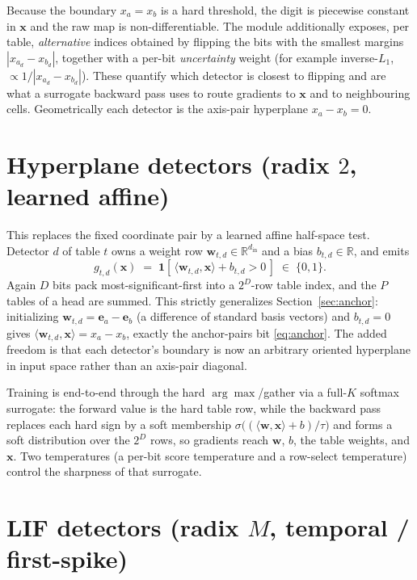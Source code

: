 \documentclass[11pt]{article}
\newcommand{\R}{\mathbb{R}}
\newcommand{\x}{\mathbf{x}}
\newcommand{\w}{\mathbf{w}}
\newcommand{\ind}[1]{\mathbf{1}\!\left[#1\right]}
\begin{document}
Because the boundary $x_a = x_b$ is a hard threshold, the digit is piecewise constant in $\x$ and the raw map
is non-differentiable. The module additionally exposes, per table, \emph{alternative} indices obtained by
flipping the bits with the smallest margins $|x_{a_d} - x_{b_d}|$, together with a per-bit \emph{uncertainty}
weight (for example inverse-$L_1$, $\propto 1/|x_{a_d} - x_{b_d}|$). These quantify which detector is closest
to flipping and are what a surrogate backward pass uses to route gradients to $\x$ and to neighbouring cells.
Geometrically each detector is the axis-pair hyperplane $x_a - x_b = 0$.

\section{Hyperplane detectors (radix $2$, learned affine)}
\label{sec:hyperplane}

This replaces the fixed coordinate pair by a learned affine half-space test. Detector $d$ of table $t$ owns a
weight row $\w_{t,d} \in \R^{d_{\mathrm{in}}}$ and a bias $b_{t,d} \in \R$, and emits
\begin{equation}
  g_{t,d}(\x) \;=\; \ind{\, \langle \w_{t,d}, \x \rangle + b_{t,d} > 0 \,} \;\in\; \{0,1\}.
  \label{eq:hyperplane}
\end{equation}
Again $D$ bits pack most-significant-first into a $2^{D}$-row table index, and the $P$ tables of a head are
summed. This strictly generalizes Section~\ref{sec:anchor}: initializing $\w_{t,d} = \mathbf{e}_{a} -
\mathbf{e}_{b}$ (a difference of standard basis vectors) and $b_{t,d} = 0$ gives $\langle \w_{t,d}, \x \rangle
= x_a - x_b$, exactly the anchor-pairs bit \eqref{eq:anchor}. The added freedom is that each detector's
boundary is now an arbitrary oriented hyperplane in input space rather than an axis-pair diagonal.

Training is end-to-end through the hard $\arg\max$/gather via a full-$K$ softmax surrogate: the forward value
is the hard table row, while the backward pass replaces each hard sign by a soft membership
$\sigma\!\big((\langle \w, \x\rangle + b)/\tau\big)$ and forms a soft distribution over the $2^{D}$ rows, so
gradients reach $\w$, $b$, the table weights, and $\x$. Two temperatures (a per-bit score temperature and a
row-select temperature) control the sharpness of that surrogate.

\section{LIF detectors (radix $M$, temporal / first-spike)}
\label{sec:lif}
\end{document}
